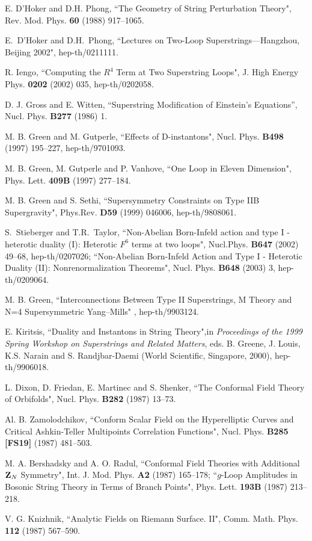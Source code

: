 \documentclass[a4paper,12pt]{article}
\begin{document}
\begin{thebibliography}{[20]}
 E. D'Hoker and D.H. Phong, ``The Geometry of
String Perturbation Theory", Rev. Mod. Phys. {\bf 60} (1988)
917--1065.

 E.~D'Hoker and D.H.~Phong, ``Lectures on
Two-Loop Superstrings---Hangzhou, Beijing 2002",  hep-th/0211111.

 R. Iengo, ``Computing the $R^4$ Term
at Two Superstring Loops", J. High Energy Phys. {\bf 0202} (2002)
035, hep-th/0202058.

 D. J. Gross and E. Witten, ``Superstring
Modification of Einstein's Equations'', Nucl. Phys. {\bf B277}
(1986) 1.

 M. B. Green and M. Gutperle, ``Effects of
D-instantons", Nucl. Phys.  {\bf B498} (1997) 195--227,
hep-th/9701093.

 M. B. Green, M. Gutperle and P. Vanhove, ``One Loop
in Eleven Dimension", Phys. Lett. {\bf 409B} (1997) 277--184.

 M. B. Green and S. Sethi, ``Supersymmetry
Constraints on Type IIB Supergravity",  Phys.Rev. {\bf D59} (1999)
046006, hep-th/9808061.

 S.~Stieberger and T.R.~Taylor, ``Non-Abelian
Born-Infeld action and type I - heterotic duality  (I): Heterotic
$F^6$ terms at two loops",  Nucl.Phys. {\bf B647} (2002) 49--68,
hep-th/0207026; ``Non-Abelian Born-Infeld Action and Type I -
Heterotic Duality (II): Nonrenormalization Theorems", Nucl. Phys.
{\bf B648} (2003) 3,  hep-th/0209064.

 M. B. Green, ``Interconnections
Between Type II Superstrings, M Theory and N=4 Supersymmetric
Yang--Mills" , hep-th/9903124.

 E. Kiritsis, ``Duality and Instantons in String
Theory",in {\it Proceedings of the 1999 Spring Workshop on
Superstrings and Related Matters}, eds. B. Greene, J. Louis, K.S.
Narain and S. Randjbar-Daemi (World Scientific, Singapore, 2000),
hep-th/9906018.

 L. Dixon, D. Friedan, E. Martinec and S. Shenker,
``The Conformal Field Theory of Orbifolds", Nucl. Phys. {\bf B282}
(1987) 13--73.

 Al. B. Zamolodchikov, ``Conform Scalar
Field on the Hyperelliptic Curves and Critical Ashkin-Teller
Multipoints Correlation Functions", Nucl. Phys. {\bf B285 [FS19]}
(1987) 481--503.

 M. A. Bershadsky and A. O. Radul, ``Conformal
Field  Theories with Additional ${\bf Z}_N$ Symmetry", Int. J.
Mod. Phys. {\bf A2} (1987) 165--178; ``$g$-Loop Amplitudes in
Bosonic String Theory in Terms of Branch Points", Phys. Lett. {\bf
193B} (1987) 213--218.

 V. G. Knizhnik, ``Analytic Fields on Riemann
Surface. II", Comm. Math. Phys. {\bf 112} (1987) 567--590.
\end{thebibliography}
\end{document}
